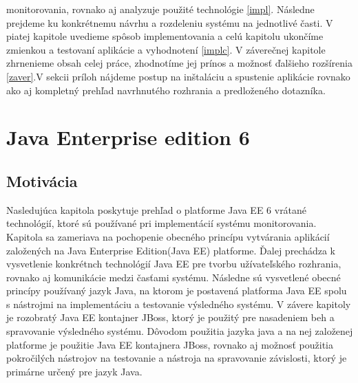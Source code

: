 monitorovania, rovnako aj analyzuje použité technológie \ref{impl}. Následne prejdeme ku konkrétnemu návrhu a rozdeleniu systému na jednotlivé časti. V piatej kapitole uvedieme spôsob implementovania a celú kapitolu ukončíme zmienkou a testovaní aplikácie a vyhodnotení \ref{implc}. V záverečnej kapitole zhrnenieme obsah celej práce, zhodnotíme jej prínos a možnosť ďalšieho rozšírenia \ref{zaver}.\newline \indent  V sekcii príloh nájdeme postup na inštaláciu a spustenie aplikácie rovnako ako aj kompletný prehľad navrhnutého rozhrania a predloženého dotazníka.


\chapter{Java Enterprise edition 6}\label{JavaEE}
\section{Motivácia}
Nasledujúca kapitola poskytuje prehľad o platforme Java EE 6 vrátané technológií, ktoré sú používané pri implementácií systému monitorovania. Kapitola sa zameriava na pochopenie obecného princípu vytvárania aplikácií založených na Java Enterprise Edition(Java EE) platforme. Ďalej prechádza k vysvetlenie konkrétnch technológií Java EE pre tvorbu užívateľského rozhrania, rovnako aj komunikácie medzi časťami systému. Následne sú vysvetlené obecné princípy používaný jazyk Java, na ktorom je postavená platforma Java EE spolu s nástrojmi na implementáciu a testovanie výsledného systému. \newline \indent V závere kapitoly je rozobratý Java EE kontajner JBoss, ktorý je použitý pre nasadeniem beh a spravovanie výsledného systému. Dôvodom použitia jazyka  java a na nej založenej platforme je použitie Java EE kontajnera JBoss, rovnako aj možnosť použitia pokročilých nástrojov na testovanie a nástroja na spravovanie závislosti, ktorý je primárne určený pre jazyk Java. 


